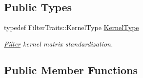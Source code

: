 \subsection*{Public Types}
\begin{DoxyCompactItemize}
\item 
typedef Filter\-Traits\-::\-Kernel\-Type \hyperlink{structffnn_1_1layer_1_1convolution_1_1_filter_a5366e7e916ee072b3a97bbbd1dc12b58}{Kernel\-Type}
\begin{DoxyCompactList}\small\item\em \hyperlink{structffnn_1_1layer_1_1convolution_1_1_filter}{Filter} kernel matrix standardization. \end{DoxyCompactList}\end{DoxyCompactItemize}
\subsection*{Public Member Functions}
